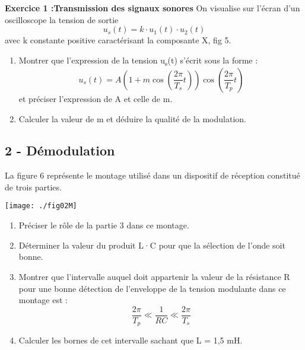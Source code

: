 \documentclass[12pt, french]{article}
\begin{document}
\begin{Box2}{\textbf{Exercice 1 :Transmission des signaux sonores} }
On visualise sur l'écran d'un oscilloscope la tension de sortie \[u_s(t) = k\cdot u_1(t)\cdot u_2(t)\] avec k constante positive caractérisant la composante X, fig 5.


\begin{enumerate}
  \item Montrer que l'expression de la tension u\textsubscript{s}(t) s'écrit sous la forme :
\[u_s(t) = A\left(1 + m\cos\left(\frac{2\pi}{T_s}t\right)\right)\cos\left(\frac{2\pi}{T_p}t\right)\]
et préciser l'expression de A et celle de m.

  
\item Calculer la valeur de m et déduire la qualité de la modulation.

\end{enumerate}
\subsection*{2 - Démodulation}
La figure 6 représente le montage utilisé dans un dispositif de réception constitué de trois parties.
  \begin{center}
	\texttt{[image: ./fig02M]}
  \end{center}

\begin{enumerate}
  
  \item Préciser le rôle de la partie 3 dans ce montage.

  \item Déterminer la valeur du produit L·C pour que la sélection de l'onde soit bonne.

  \item Montrer que l'intervalle auquel doit appartenir la valeur de la résistance R pour une bonne détection de l'enveloppe de la tension modulante dans ce montage est :
\[\frac{2\pi}{T_p} \ll \frac{1}{RC} \ll \frac{2\pi}{T_s}\]

\item Calculer les bornes de cet intervalle sachant que L = 1,5 mH.

\end{enumerate}

\end{Box2}
\end{document}
